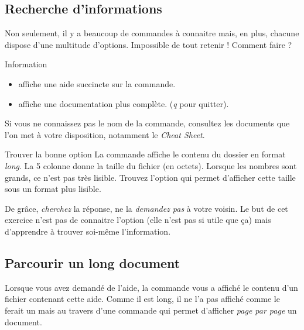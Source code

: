 \documentclass[a4paper,11pt]{style-esi/td}
\begin{document}
	\subsection{Recherche d'informations}  

		Non seulement, il y a beaucoup de commandes à connaitre mais, en plus, 
		chacune dispose d'une multitude d'options. 
		Impossible de tout retenir ! Comment faire ?   

		\begin{theorie}{Information}
			\begin{itemize}
			\item 
				affiche une aide succincte sur la commande.
			\item 
				 affiche une documentation plus complète.
				(\textit{q} pour quitter).
			\end{itemize}
		\end{theorie}

		Si vous ne connaissez pas le nom de la commande,
		consultez les documents que l'on met à votre disposition,
		notamment le \textit{ Cheat Sheet}.  

		\begin{Exercice}{Trouver la bonne option} 
			La commande  
			affiche le contenu du dossier en format \textit{long}.
			La 5\ieme{} colonne donne la taille du fichier (en octets).
			Lorsque les nombres sont grands, ce n'est pas très lisible. 
			Trouvez l'option qui permet d'afficher cette taille sous un format plus lisible.  
			
			\begin{alertbox} 
				De grâce, \emph{cherchez} la réponse, 
				ne la \emph{demandez pas} à votre voisin. 
				Le but de cet exercice n'est pas de connaitre l'option 
				(elle n'est pas si utile que \c ca) 
				mais d'apprendre à trouver soi-même l'information.  
			\end{alertbox}
		\end{Exercice}

	\subsection{Parcourir un long document}  

		Lorsque vous avez demandé de l'aide, 
		la commande  vous a affiché 
		le contenu d'un fichier contenant cette aide.
		Comme il est long, il ne l'a pas affiché comme le ferait un 
		mais au travers d'une commande 
		qui permet d'afficher \emph{page par page} un document.
\end{document}
